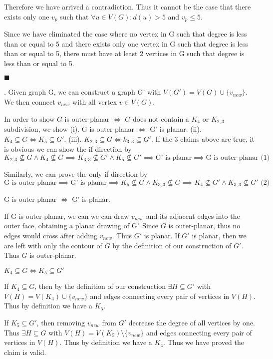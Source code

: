 \documentclass[12pt]{article}
\begin{document}
	Therefore we have arrived a contradiction. Thus it cannot be the case that there exists only one $v_p$ such that $\forall u \in V(G): d(u) > 5$ and $v_p \leq 5$. 
	
	Since we have eliminated the case where no vertex in G such that degree is less than or equal to 5 and there exists only one vertex in G such that degree is less than or equal to 5, there must have at least 2 vertices in G such that degree is less than or equal to 5.
	
		\hfill $\blacksquare$
		
	\newpage
		
	.  Given graph G, we can construct a graph G' with $V(G') = V(G) \cup \{v_{new}\}$. We then connect $v_{new}$ with all vertex $v \in V(G)$.
	
	 In order to show $G$ is outer-planar $\iff$ $G$ does not contain a $K_4$ or $K_{2,3}$ subdivision, we show (i). G is outer-planar $\iff$ G' is planar. (ii). $K_4 \subseteq G \iff K_5 \subseteq G'$. (iii).  $K_{2,3} \subseteq G \iff k_{3,3} \subseteq G'$. If the 3 claims above are true, it is obvious we can show the if direction by
	$$K_{2,3} \nsubseteq G \land K_4 \nsubseteq G \implies K_{3,3} \nsubseteq G' \land K_5 \nsubseteq G' \implies \text{G' is planar} \implies \text{G is outer-planar} \text{  (1)}$$   
	
	Similarly, we can prove the only if direction by
	$$\text{G is outer-planar} \implies \text{G' is planar} \implies K_{5} \nsubseteq G \land K_{3,3} \nsubseteq G \implies K_{4} \nsubseteq G' \land K_{3,3} \nsubseteq G' \text{  (2)}$$ 
	
	 G is outer-planar $\iff$ G' is planar.
	
	If G is outer-planar, we can  we can draw $v_{new}$ and its adjacent edges into the outer face,
	obtaining a planar drawing of G'. Since $G$ is outer-planar, thus no edges would cross after adding $v_{new}$. Thus $G'$ is planar. If $G'$ is planar, then we are left with only the contour of $G$ by the definition of our construction of $G'$. Thus $G$ is outer-planar.
	
	  $K_4 \subseteq G \iff K_5 \subseteq G'$
	
	If $K_4 \subseteq G$, then by the definition of our construction $\exists H \subseteq G'$ with $V(H) = V(K_4) \cup \{v_{new}\}$ and edges connecting every pair of vertices in $V(H)$. Thus by definition we have a $K_5$.
	 
	If $K_5 \subseteq G'$, then removing $v_{new}$ from $G'$ decrease the degree of all vertices by one. Thus $\exists H \subseteq G$ with $V(H) = V(K_5) \setminus \{v_{new}\}$ and edges connecting every pair of vertices in $V(H)$. Thus by definition we have a $K_4$. Thus we have proved the claim is valid.
	
\end{document}
